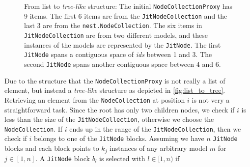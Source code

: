 \begin{figure}[ht!]
\begin{tikzpicture}[x=0.75pt,y=0.75pt,yscale=-1,xscale=1]
\end{tikzpicture}

    \caption{From list to \emph{tree-like} structure: The initial \texttt{NodeCollectionProxy} has 9 items. The first 6 items are from the \texttt{JitNodeCollection} and the last 3 are from the \texttt{nest.NodeCollection}. The six items  in \texttt{JitNodeCollection} are from two different models, and these instances of the models are represented by the \texttt{JitNode}. The first \texttt{JitNode} spans a contiguous space of \emph{ids} between 1 and 3. The second \texttt{JitNode} spans another contiguous space between 4 and 6.}
    \label{fig:list_to_tree}
\end{figure}


Due to the structure that the \texttt{NodeCollectionProxy} is not really a list of element, but instead a \emph{tree-like} structure as depicted in \autoref{fig:list_to_tree}. Retrieving an element from the \texttt{NodeCollection} at position $i$ is not very a straightforward task. Since the root has only two children nodes, we check if $i$ is less than the size of the \texttt{JitNodeCollection}, otherwise we choose the \texttt{NodeCollection}. If $i$ ends up in the range of the \texttt{JitNodeCollection}, then we check if $i$ belongs to one of the \texttt{JitNode} blocks. Assuming we have $n$ \texttt{JitNode} blocks and each block points to $k_j$ instances of any arbitrary model $m$ for $j \in [1, n]$. A \texttt{JitNode} block  $b_l$ is selected with $ l \in [1, n)$ if

